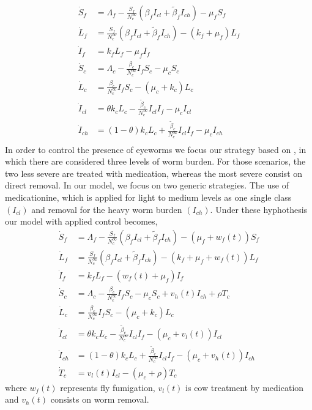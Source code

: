 \documentclass[preprint,12pt]{elsarticle}
\begin{document}
\begin{equation}\label{Eq:SIvectorhostmodel_v2}
\begin{aligned}
    \dot{S}_f&=
        \Lambda_f-\frac{S_f}{N_c^{\infty}}\left(\beta_fI_{cl}+\tilde{\beta}_fI_{ch} \right)-\mu_fS_f
    \\
    \dot{L}_f&=
        \frac{S_f}{N_c^{\infty}}\left(\beta_fI_{cl}+\tilde{\beta}_fI_{ch}\right)-\left(k_f+\mu_f\right)L_f
    \\
    \dot{I}_f&=
        k_f L_f-\mu_fI_f
    \\
    \dot{S}_c&=
        \Lambda_c-\frac{\beta_c}{N_c^{\infty}}I_fS_c-\mu_cS_c
    \\
    \dot{L}_c&=
        \frac{\beta_c}{N_c^{\infty}}I_fS_c-\left(\mu_c+k_c\right)L_c
    \\
    \dot{I}_{cl}&=  \theta k_c L_c- \frac{\tilde{\beta}_c}{N_c^{\infty}}I_{cl}I_f-\mu_c I_{cl}
    \\
    \dot{I}_{ch}&= (1-\theta) k_c L_c + \frac{\tilde{\beta}_c}{N_c^{\infty}}I_{cl}I_f- \mu_c I_{ch}
    \\
\end{aligned}
\end{equation}
\noindent In order to control the presence of eyeworms we focus our strategy based on \cite{Manjunath:2016}, in which there are considered three levels of worm burden. For those scenarios, the two less severe are treated with medication, whereas the most severe consist on direct removal. In our model, we focus on two generic strategies. The use of medicationine, which is applied for light to medium levels as one single class $(I_{cl})$ and removal for the heavy worm burden $(I_{ch})$. Under these hyphothesis our model with applied control becomes,
\begin{equation}\label{Eq:SIvectorhostmodel_v2controlled}
\begin{aligned}
    \dot{S}_f&=
        \Lambda_f-\frac{S_f}{N_c^{\infty}}\left(\beta_fI_{cl}+\tilde{\beta}_fI_{ch} \right)-\left(\mu_f+w_f(t)\right)S_f
    \\
    \dot{L}_f&=
        \frac{S_f}{N_c^{\infty}}\left(\beta_fI_{cl}+\tilde{\beta}_fI_{ch}\right)-\left(k_f+\mu_f+w_f(t)\right)L_f
    \\
    \dot{I}_f&=
        k_f L_f-\left(w_f(t)+\mu_f\right)I_f
    \\
    \dot{S}_c&=
        \Lambda_c-\frac{\beta_c}{N_c^{\infty}}I_fS_c-\mu_cS_c+v_h(t)I_{ch}+\rho T_c
    \\
    \dot{L}_c&=
        \frac{\beta_c}{N_c^{\infty}}I_fS_c-\left(\mu_c+k_c\right)L_c
    \\
    \dot{I}_{cl}&=  \theta k_c L_c- \frac{\tilde{\beta}_c}{N_c^{\infty}}I_{cl}I_f-(\mu_c+v_l(t)) I_{cl}
    \\
    \dot{I}_{ch}&= (1-\theta) k_c L_c + \frac{\tilde{\beta}_c}{N_c^{\infty}}I_{cl}I_f- (\mu_c+v_h(t)) I_{ch}
    \\
    \dot{T}_c&= v_l(t)I_{cl}-\left(\mu_c+\rho\right)T_c
\end{aligned}
\end{equation}
where $w_f(t)$ represents fly fumigation, $v_l(t)$ is cow treatment by medication and $v_h(t)$ consists on worm removal.\\
\end{document}
